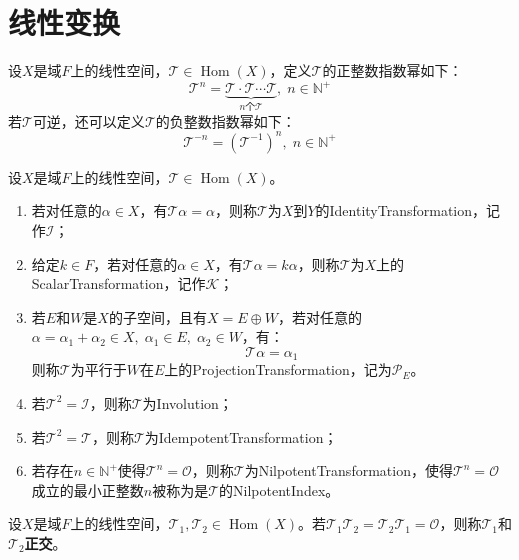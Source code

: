 \section{线性变换}
\begin{definition}
	设$X$是域$F$上的线性空间，$\mathcal{T}\in\operatorname{Hom}(X)$，定义$\mathcal{T}$的正整数指数幂如下：
	\begin{equation*}
		\mathcal{T}^n=\underbrace{\mathcal{T} \cdot \mathcal{T} \cdots \mathcal{T}}_{n\text{个}\mathcal{T}}
		,\;n\in \mathbb{N}^+
	\end{equation*}
	若$\mathcal{T}$可逆，还可以定义$\mathcal{T}$的负整数指数幂如下：
	\begin{equation*}
		\mathcal{T}^{-n}=(\mathcal{T}^{-1})^n,\;n\in\mathbb{N}^+
	\end{equation*}
\end{definition}
\begin{definition}
	设$X$是域$F$上的线性空间，$\mathcal{T}\in\operatorname{Hom}(X)$。
	\begin{enumerate}
		\item 若对任意的$\alpha\in X$，有$\mathcal{T}\alpha=\alpha$，则称$\mathcal{T}$为$X$到$Y$的\gls{IdentityTransformation}，记作$\mathcal{I}$；
		\item 给定$k\in F$，若对任意的$\alpha\in X$，有$\mathcal{T}\alpha=k\alpha$，则称$\mathcal{T}$为$X$上的\gls{ScalarTransformation}，记作$\mathcal{K}$；
		\item 若$E$和$W$是$X$的子空间，且有$X=E\oplus W$，若对任意的$\alpha=\alpha_1+\alpha_2\in X,\;\alpha_1\in E,\;\alpha_2\in W$，有：
		\begin{equation*}
			\mathcal{T}\alpha=\alpha_1
		\end{equation*}
		则称$\mathcal{T}$为平行于$W$在$E$上的\gls{ProjectionTransformation}，记为$\mathcal{P}_E$。
		\item 若$\mathcal{T}^2=\mathcal{I}$，则称$\mathcal{T}$为\gls{Involution}；
		\item 若$\mathcal{T}^2=\mathcal{T}$，则称$\mathcal{T}$为\gls{IdempotentTransformation}；
		\item 若存在$n\in\mathbb{N}^+$使得$\mathcal{T}^n=\mathcal{O}$，则称$\mathcal{T}$为\gls{NilpotentTransformation}，使得$\mathcal{T}^n=\mathcal{O}$成立的最小正整数$n$被称为是$\mathcal{T}$的\gls{NilpotentIndex}。
	\end{enumerate}
\end{definition}
\begin{definition}
	设$X$是域$F$上的线性空间，$\mathcal{T}_1,\mathcal{T}_2\in \operatorname{Hom}(X)$。若$\mathcal{T}_1\mathcal{T}_2=\mathcal{T}_2\mathcal{T}_1=\mathcal{O}$，则称$\mathcal{T}_1$和$\mathcal{T}_2$\textbf{正交}。
\end{definition}

